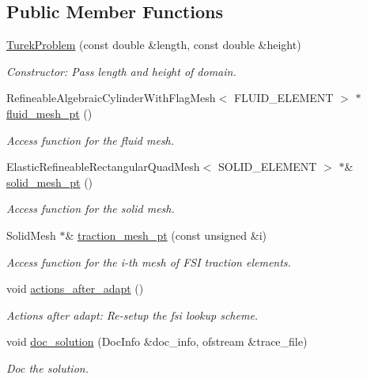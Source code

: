 \subsection*{Public Member Functions}
\begin{DoxyCompactItemize}
\item 
\hyperlink{classTurekProblem_a69f6624fd854393f0c0e5303603ec749}{Turek\+Problem} (const double \&length, const double \&height)
\begin{DoxyCompactList}\small\item\em Constructor\+: Pass length and height of domain. \end{DoxyCompactList}\item 
Refineable\+Algebraic\+Cylinder\+With\+Flag\+Mesh$<$ F\+L\+U\+I\+D\+\_\+\+E\+L\+E\+M\+E\+NT $>$ $\ast$ \hyperlink{classTurekProblem_a0fc23b86efec256cb7f4450a928f7999}{fluid\+\_\+mesh\+\_\+pt} ()
\begin{DoxyCompactList}\small\item\em Access function for the fluid mesh. \end{DoxyCompactList}\item 
Elastic\+Refineable\+Rectangular\+Quad\+Mesh$<$ S\+O\+L\+I\+D\+\_\+\+E\+L\+E\+M\+E\+NT $>$ $\ast$\& \hyperlink{classTurekProblem_a89430ae6d87a85a83e23e14e0b0d72b7}{solid\+\_\+mesh\+\_\+pt} ()
\begin{DoxyCompactList}\small\item\em Access function for the solid mesh. \end{DoxyCompactList}\item 
Solid\+Mesh $\ast$\& \hyperlink{classTurekProblem_a93a4b3d4e598a499631e00cfa701ee3c}{traction\+\_\+mesh\+\_\+pt} (const unsigned \&i)
\begin{DoxyCompactList}\small\item\em Access function for the i-\/th mesh of F\+SI traction elements. \end{DoxyCompactList}\item 
void \hyperlink{classTurekProblem_a39df0332d7606a5befe89bb0e581184b}{actions\+\_\+after\+\_\+adapt} ()
\begin{DoxyCompactList}\small\item\em Actions after adapt\+: Re-\/setup the fsi lookup scheme. \end{DoxyCompactList}\item 
void \hyperlink{classTurekProblem_a2cf0eb1610b4c3a7cdbd3c7948cdd46e}{doc\+\_\+solution} (Doc\+Info \&doc\+\_\+info, ofstream \&trace\+\_\+file)
\begin{DoxyCompactList}\small\item\em Doc the solution. \end{DoxyCompactList}\item 

\end{DoxyCompactItemize}
